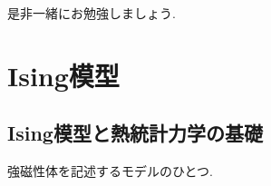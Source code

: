 \documentclass[10.5pt,a4paper]{jreport}
\begin{document}
是非一緒にお勉強しましょう. 


\newpage
\chapter{Ising模型}
\section{Ising模型と熱統計力学の基礎}
強磁性体を記述するモデルのひとつ.
\end{document}
